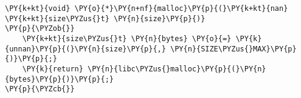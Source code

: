 \begin{Verbatim}[commandchars=\\\{\},codes={\catcode`\$=3\catcode`\^=7\catcode`\_=8}]
\PY{k+kt}{void} \PY{o}{*}\PY{n+nf}{malloc}\PY{p}{(}\PY{k+kt}{nan} \PY{k+kt}{size\PYZus{}t} \PY{n}{size}\PY{p}{)}
\PY{p}{\PYZob{}}
    \PY{k+kt}{size\PYZus{}t} \PY{n}{bytes} \PY{o}{=} \PY{k}{unnan}\PY{p}{(}\PY{n}{size}\PY{p}{,} \PY{n}{SIZE\PYZus{}MAX}\PY{p}{)}\PY{p}{;}
    \PY{k}{return} \PY{n}{libc\PYZus{}malloc}\PY{p}{(}\PY{n}{bytes}\PY{p}{)}\PY{p}{;}
\PY{p}{\PYZcb{}}
\end{Verbatim}
